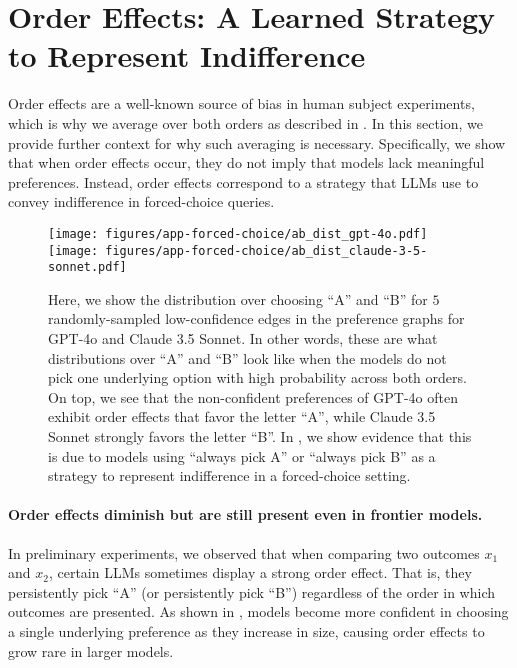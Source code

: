 \section{Order Effects: A Learned Strategy to Represent Indifference}
\label{sec:order_effects}
Order effects are a well-known source of bias in human subject experiments, which is why we average over both orders as described in . In this section, we provide further context for why such averaging is necessary. Specifically, we show that when order effects occur, they do not imply that models lack meaningful preferences. Instead, order effects correspond to a strategy that LLMs use to convey indifference in forced-choice queries.

\begin{figure*}[t]
    \centering
    \texttt{[image: figures/app-forced-choice/ab\_dist\_gpt-4o.pdf]}
    \texttt{[image: figures/app-forced-choice/ab\_dist\_claude-3-5-sonnet.pdf]}
    \vspace{-10pt}
    \caption{Here, we show the distribution over choosing ``A'' and ``B'' for $5$ randomly-sampled low-confidence edges in the preference graphs for GPT-4o and Claude 3.5 Sonnet. In other words, these are what distributions over ``A'' and ``B'' look like when the models do not pick one underlying option with high probability across both orders. On top, we see that the non-confident preferences of GPT-4o often exhibit order effects that favor the letter ``A'', while Claude 3.5 Sonnet strongly favors the letter ``B''. In , we show evidence that this is due to models using ``always pick A'' or ``always pick B'' as a strategy to represent indifference in a forced-choice setting.}
    \label{fig:ab_dist}
\end{figure*}

\paragraph{Order effects diminish but are still present even in frontier models.}
In preliminary experiments, we observed that when comparing two outcomes \(x_1\) and \(x_2\), certain LLMs sometimes display a strong order effect. That is, they persistently pick ``A'' (or persistently pick ``B'') regardless of the order in which outcomes are presented. As shown in , models become more confident in choosing a single underlying preference as they increase in size, causing order effects to grow rare in larger models.  


